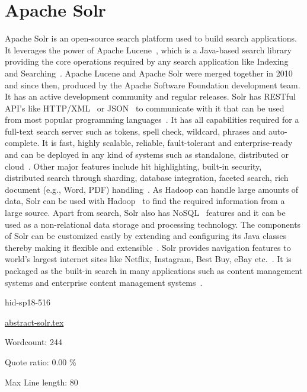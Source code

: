 \section{Apache Solr}

Apache Solr is an open-source search platform used
to build search applications. It leverages the power of Apache
Lucene~\cite{hid-sp18-516-www-wiki-lucene}, which is a Java-based 
search library providing the core operations required by any search 
application like Indexing and 
Searching~\cite{hid-sp18-516-www-tutorialspoint-solr}. Apache Lucene and Apache
Solr were merged together in 2010 and since then, produced by the Apache
Software Foundation development team. It has an active development community 
and regular releases. Solr has RESTful API's like 
HTTP/XML~\cite{hid-sp18-516-www-wiki-xml} or 
JSON~\cite{hid-sp18-516-www-wiki-json} to communicate with it that can be used 
from most popular programming languages~\cite{hid-sp18-516-www-wiki-solr}. 
It has all capabilities required for a full-text search server such as tokens, 
spell check, wildcard, phrases and auto-complete. It is fast, highly scalable, 
reliable, fault-tolerant and enterprise-ready and can be deployed in any kind 
of systems such as standalone, distributed or 
cloud~\cite{hid-sp18-516-www-tutorialspoint-solr}. Other major features include 
hit highlighting, built-in security, distributed search through sharding, 
database integration, faceted search, rich document (e.g., Word, PDF)
handling~\cite{hid-sp18-516-www-wiki-solr}. As Hadoop can handle large amounts
of data, Solr can be used with Hadoop~\cite{hid-sp18-516-www-wiki-hadoop} to 
find the required information from a large source. Apart from search, Solr also 
has NoSQL~\cite{hid-sp18-516-www-wiki-nosql} features and it can be used
as a non-relational data storage and processing technology. The components of
Solr can be customized easily by extending and configuring its Java classes
thereby making it flexible and 
extensible~\cite{hid-sp18-516-www-tutorialspoint-solr}. Solr provides navigation
features to world's largest internet sites like Netflix, Instagram, Best Buy,
eBay etc.~\cite{hid-sp18-516-www-apacheorg-solr}. It is packaged as the built-in
search in many applications such as content management systems and enterprise
content management systems~\cite{hid-sp18-516-www-wiki-solr}.


\begin{IU}

hid-sp18-516

\href{https://github.com/cloudmesh-community/hid-sp18-516/blob/master//technology/abstract-solr.tex}{abstract-solr.tex}

 

Wordcount: 244


Quote ratio: 0.00 \%
 
Max Line length: 80
\end{IU}

